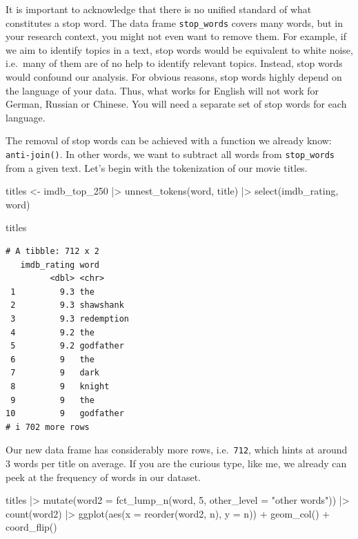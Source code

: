 \documentclass[
  letterpaper,
]{krantz}
\makeatletter
\newenvironment{Shaded}{\begin{snugshade}}{\end{snugshade}}
\newcommand{\AttributeTok}[1]{\textcolor[rgb]{0.40,0.45,0.13}{#1}}
\newcommand{\DecValTok}[1]{\textcolor[rgb]{0.68,0.00,0.00}{#1}}
\newcommand{\FunctionTok}[1]{\textcolor[rgb]{0.28,0.35,0.67}{#1}}
\newcommand{\NormalTok}[1]{\textcolor[rgb]{0.00,0.23,0.31}{#1}}
\newcommand{\OtherTok}[1]{\textcolor[rgb]{0.00,0.23,0.31}{#1}}
\newcommand{\SpecialCharTok}[1]{\textcolor[rgb]{0.37,0.37,0.37}{#1}}
\newcommand{\StringTok}[1]{\textcolor[rgb]{0.13,0.47,0.30}{#1}}
\newenvironment{kframe}{%
\medskip{}
\setlength{\fboxsep}{.8em}
 \def\at@end@of@kframe{}%
 \ifinner\ifhmode%
  \def\at@end@of@kframe{\end{minipage}}%
  \begin{minipage}{\columnwidth}%
 \fi\fi%
 \def\FrameCommand##1{\hskip\@totalleftmargin \hskip-\fboxsep
 \colorbox{shadecolor}{##1}\hskip-\fboxsep
     \hskip-\linewidth \hskip-\@totalleftmargin \hskip\columnwidth}%
 \MakeFramed {\advance\hsize-\width
   \@totalleftmargin\z@ \linewidth\hsize
   \@setminipage}}%
 {\par\unskip\endMakeFramed%
 \at@end@of@kframe}
\renewenvironment{Shaded}{\begin{kframe}}{\end{kframe}}
\makeatother
\begin{document}
It is important to acknowledge that there is no unified standard of what
constitutes a stop word. The data frame \texttt{stop\_words} covers many
words, but in your research context, you might not even want to remove
them. For example, if we aim to identify topics in a text, stop words
would be equivalent to white noise, i.e.~many of them are of no help to
identify relevant topics. Instead, stop words would confound our
analysis. For obvious reasons, stop words highly depend on the language
of your data. Thus, what works for English will not work for German,
Russian or Chinese. You will need a separate set of stop words for each
language.

The removal of stop words can be achieved with a function we already
know: \texttt{anti-join()}. In other words, we want to subtract all
words from \texttt{stop\_words} from a given text. Let's begin with the
tokenization of our movie titles.

\begin{Shaded}
\begin{Highlighting}[]
\NormalTok{titles }\OtherTok{\textless{}{-}}
\NormalTok{  imdb\_top\_250 }\SpecialCharTok{|\textgreater{}}
  \FunctionTok{unnest\_tokens}\NormalTok{(word, title) }\SpecialCharTok{|\textgreater{}}
  \FunctionTok{select}\NormalTok{(imdb\_rating, word)}

\NormalTok{titles}
\end{Highlighting}
\end{Shaded}

\begin{verbatim}
# A tibble: 712 x 2
   imdb_rating word      
         <dbl> <chr>     
 1         9.3 the       
 2         9.3 shawshank 
 3         9.3 redemption
 4         9.2 the       
 5         9.2 godfather 
 6         9   the       
 7         9   dark      
 8         9   knight    
 9         9   the       
10         9   godfather 
# i 702 more rows
\end{verbatim}

Our new data frame has considerably more rows, i.e.~\texttt{712}, which
hints at around 3 words per title on average. If you are the curious
type, like me, we already can peek at the frequency of words in our
dataset.

\begin{Shaded}
\begin{Highlighting}[]
\NormalTok{titles }\SpecialCharTok{|\textgreater{}}
  \FunctionTok{mutate}\NormalTok{(}\AttributeTok{word2 =} \FunctionTok{fct\_lump\_n}\NormalTok{(word, }\DecValTok{5}\NormalTok{,}
                            \AttributeTok{other\_level =} \StringTok{"other words"}\NormalTok{)) }\SpecialCharTok{|\textgreater{}}
  \FunctionTok{count}\NormalTok{(word2) }\SpecialCharTok{|\textgreater{}}
  \FunctionTok{ggplot}\NormalTok{(}\FunctionTok{aes}\NormalTok{(}\AttributeTok{x =} \FunctionTok{reorder}\NormalTok{(word2, n),}
             \AttributeTok{y =}\NormalTok{ n)) }\SpecialCharTok{+}
  \FunctionTok{geom\_col}\NormalTok{() }\SpecialCharTok{+}
  \FunctionTok{coord\_flip}\NormalTok{()}
\end{Highlighting}
\end{Shaded}
\end{document}
